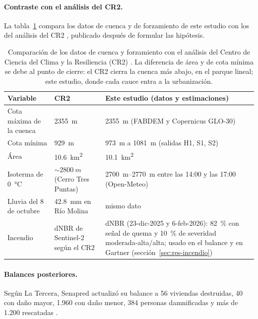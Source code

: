 \paragraph{Contraste con el análisis del CR2.} La tabla~\ref{tab:cr2} compara los datos de cuenca y de forzamiento de este estudio con los del análisis del CR2 \citep{cr2_2026}, publicado después de formular las hipótesis.
\begin{table}[htbp]\centering\small
\caption{Comparación de los datos de cuenca y forzamiento con el análisis del Centro de Ciencia del Clima y la Resiliencia (CR2) \citep{cr2_2026}. La diferencia de área y de cota mínima se debe al punto de cierre: el CR2 cierra la cuenca más abajo, en el parque lineal; este estudio, donde cada cauce entra a la urbanización.}\label{tab:cr2}
\begin{tabular}{p{}p{}p{}}\toprule
Variable & CR2 & Este estudio (datos y estimaciones)\\\midrule
Cota máxima de la cuenca & \SI{2355}{m} & \SI{2355}{m} (FABDEM y Copernicus GLO-30)\\
Cota mínima & \SI{929}{m} & \SI{973}{m} a \SI{1081}{m} (salidas H1, S1, S2)\\
Área & \SI{10,6}{km^2} & \SI{10,1}{km^2}\\
Isoterma de \SI{0}{\celsius} & $\sim\SI{2800}{m}$ (Cerro Tres Puntas) & \SIrange{2700}{2770}{m} entre las 14:00 y las 17:00 (Open-Meteo)\\
Lluvia del 8 de octubre & \SI{42,8}{mm} en Río Molina & mismo dato\\
Incendio & dNBR de Sentinel-2 según el CR2 & dNBR (23-dic-2025 y 6-feb-2026): \SI{82}{\percent} con señal de quema y \SI{10}{\percent} de severidad moderada-alta/alta; usado en el balance y en Gartner (sección~\ref{sec:res-incendio})\\
\bottomrule\end{tabular}
\end{table}

\paragraph{Balances posteriores.} Según La Tercera, Senapred actualizó su balance a 56 viviendas destruidas, 40 con daño mayor, 1.960 con daño menor, 384 personas damnificadas y más de 1.200 rescatadas \citep{latercera2026senapred}.
